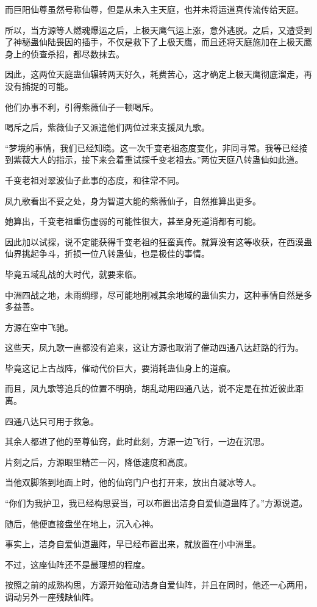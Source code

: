 \begin{this_body}
而巨阳仙尊虽然号称仙尊，但是从未入主天庭，也并未将运道真传流传给天庭。

所以，当方源等人燃魂爆运之后，上极天鹰气运上涨，意外逃脱。之后，又遭受到了神秘蛊仙陆畏因的插手，不仅是救下了上极天鹰，而且还将天庭施加在上极天鹰身上的侦查杀招，都尽数抹去。

因此，这两位天庭蛊仙辗转两天好久，耗费苦心，这才确定上极天鹰彻底溜走，再没有捕捉的可能。

他们办事不利，引得紫薇仙子一顿喝斥。

喝斥之后，紫薇仙子又派遣他们两位过来支援凤九歌。

“梦境的事情，我们已经知晓。这一次千变老祖态度变化，非同寻常。我等已经接到紫薇大人的指示，接下来会着重试探千变老祖去。”两位天庭八转蛊仙如此道。

千变老祖对翠波仙子此事的态度，和往常不同。

凤九歌看出不妥之处，身为智道大能的紫薇仙子，自然推算出更多。

她算出，千变老祖重伤虚弱的可能性很大，甚至身死道消都有可能。

因此加以试探，说不定能获得千变老祖的狂蛮真传。就算没有这等收获，在西漠蛊仙界挑起争斗，折损一位八转蛊仙，也是极佳的事情。

毕竟五域乱战的大时代，就要来临。

中洲四战之地，未雨绸缪，尽可能地削减其余地域的蛊仙实力，这种事情自然是多多益善。

方源在空中飞驰。

这些天，凤九歌一直都没有追来，这让方源也取消了催动四通八达赶路的行为。

毕竟这记上古战阵，催动代价巨大，要消耗蛊仙身上的道痕。

而且，凤九歌等追兵的位置不明确，胡乱动用四通八达，说不定是在拉近彼此距离。

四通八达只可用于救急。

其余人都进了他的至尊仙窍，此时此刻，方源一边飞行，一边在沉思。

片刻之后，方源眼里精芒一闪，降低速度和高度。

当他双脚落到地面上时，他的仙窍门户也打开来，放出白凝冰等人。

“你们为我护卫，我已经构思妥当，可以布置出洁身自爱仙道蛊阵了。”方源说道。

随后，他便直接盘坐在地上，沉入心神。

事实上，洁身自爱仙道蛊阵，早已经布置出来，就放置在小中洲里。

不过，这座仙阵还不是最理想的程度。

按照之前的成熟构思，方源开始催动洁身自爱仙阵，并且在同时，他还一心两用，调动另外一座残缺仙阵。


\end{this_body}

